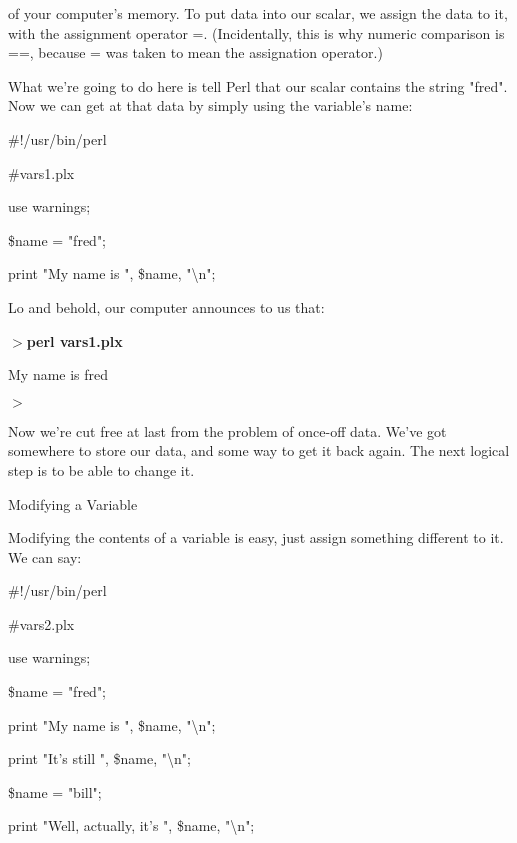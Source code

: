 \documentclass[a4paper,11pt]{book}
\begin{document}
\noindent of your computer's memory. To put data into our scalar, we assign the data to it, with the assignment operator =. (Incidentally, this is why numeric comparison is ==, because = was taken to mean the assignation operator.)

\noindent 

\noindent What we're going to do here is tell Perl that our scalar contains the string "fred". Now we can get at that data by simply using the variable's name:

\noindent 

\noindent \#!/usr/bin/perl

\noindent \#vars1.plx

\noindent use warnings;

\noindent \$name = "fred";

\noindent print "My name is ", \$name, "\textbackslash n";

\noindent 

\noindent 

\noindent Lo and behold, our computer announces to us that:

\noindent 

\noindent $>$\textbf{perl vars1.plx}

\noindent My name is fred

\noindent $>$

\noindent 

\noindent Now we're cut free at last from the problem of once-off data. We've got somewhere to store our data, and some way to get it back again. The next logical step is to be able to change it.

\noindent 

\noindent Modifying a Variable

\noindent 

\noindent Modifying the contents of a variable is easy, just assign something different to it. We can say:

\noindent 

\noindent \#!/usr/bin/perl

\noindent \#vars2.plx

\noindent use warnings;

\noindent \$name = "fred";

\noindent print "My name is ", \$name, "\textbackslash n";

\noindent print "It's still ", \$name, "\textbackslash n";

\noindent \$name = "bill";

\noindent print "Well, actually, it's ", \$name, "\textbackslash n";
\end{document}
